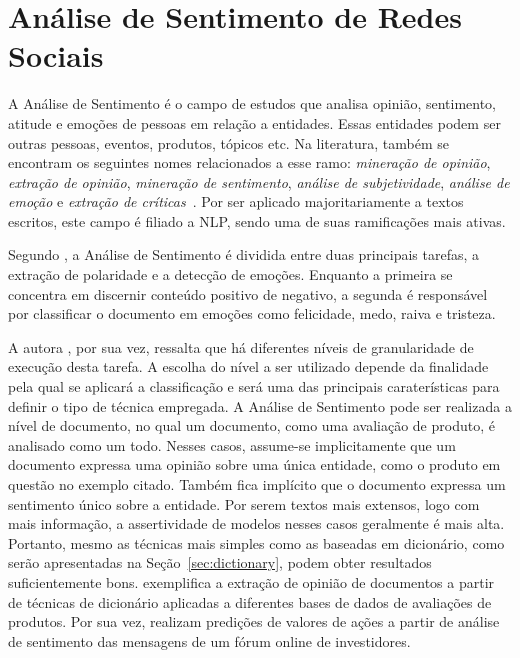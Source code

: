\chapter{Análise de Sentimento de Redes Sociais}
\label{chapter:sentiment}

A Análise de Sentimento é o campo de estudos que analisa opinião, sentimento,
atitude e emoções de pessoas em relação a entidades.
Essas entidades podem ser outras pessoas, eventos, produtos, tópicos etc.
Na literatura, também se encontram os seguintes nomes relacionados a esse ramo:
\textit{mineração de opinião}, \textit{extração de opinião},
\textit{mineração de sentimento}, \textit{análise de subjetividade},
\textit{análise de emoção} e \textit{extração de críticas}~\cite{liu15}.
Por ser aplicado majoritariamente a textos escritos, este campo é filiado
a NLP, sendo uma de suas ramificações mais ativas.

Segundo \citet{cambria16}, a Análise de Sentimento é dividida entre duas
principais tarefas, a extração de polaridade e a detecção de emoções.
Enquanto a primeira se concentra em discernir conteúdo positivo de negativo,
a segunda é responsável por classificar o documento em emoções como felicidade,
medo, raiva e tristeza.

A autora \citet{liu15}, por sua vez, ressalta que há diferentes níveis de
granularidade de execução desta tarefa.
A escolha do nível a ser utilizado depende da finalidade pela qual se aplicará
a classificação e será uma das principais caraterísticas para definir o tipo
de técnica empregada.
A Análise de Sentimento pode ser realizada a nível de documento, no qual um
documento, como uma avaliação de produto, é analisado como um todo.
Nesses casos, assume-se implicitamente que um documento expressa uma opinião
sobre uma única entidade, como o produto em questão no exemplo citado.
Também fica implícito que o documento expressa um sentimento único sobre a
entidade.
Por serem textos mais extensos, logo com mais informação, a assertividade de
modelos nesses casos geralmente é mais alta.
Portanto, mesmo as técnicas mais simples como as baseadas em dicionário, como
serão apresentadas na Seção~\ref{sec:dictionary}, podem obter resultados
suficientemente bons.
\citet{taboada11} exemplifica a extração de opinião de documentos a partir de
técnicas de dicionário aplicadas a diferentes bases de dados de avaliações de
produtos.
Por sua vez, \citet{das07} realizam predições de valores de ações a partir de
análise de sentimento das mensagens de um fórum online de investidores.

